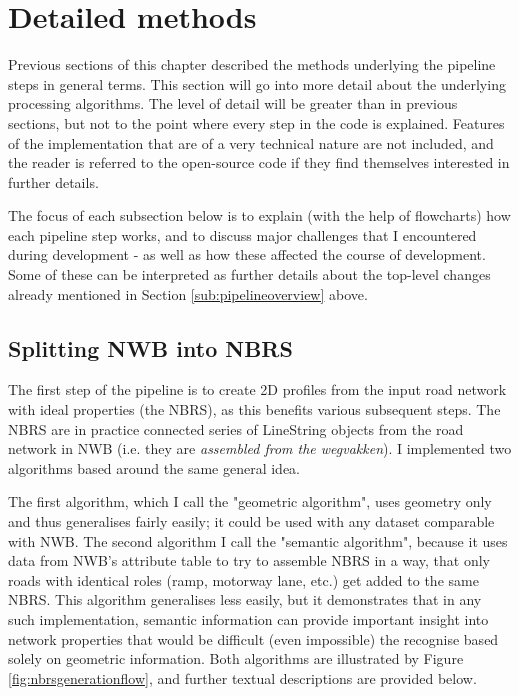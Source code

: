 \section{Detailed methods}
\label{sec:methods}

Previous sections of this chapter described the methods underlying the pipeline steps in general terms. This section will go into more detail about the underlying processing algorithms. The level of detail will be greater than in previous sections, but not to the point where every step in the code is explained. Features of the implementation that are of a very technical nature are not included, and the reader is referred to the open-source code if they find themselves interested in further details.

The focus of each subsection below is to explain (with the help of flowcharts) how each pipeline step works, and to discuss major challenges that I encountered during development - as well as how these affected the course of development. Some of these can be interpreted as further details about the top-level changes already mentioned in Section \ref{sub:pipelineoverview} above.

\subsection{Splitting NWB into NBRS}
\label{sub:m_nbrsgeneration}

The first step of the pipeline is to create 2D profiles from the input road network with ideal properties (the NBRS), as this benefits various subsequent steps. The NBRS are in practice connected series of LineString objects from the road network in NWB (i.e. they are \textit{assembled from the wegvakken}). I implemented two algorithms based around the same general idea.

The first algorithm, which I call the "geometric algorithm", uses geometry only and thus generalises fairly easily; it could be used with any dataset comparable with NWB. The second algorithm I call the "semantic algorithm", because it uses data from NWB's attribute table to try to assemble NBRS in a way, that only roads with identical roles (ramp, motorway lane, etc.) get added to the same NBRS. This algorithm generalises less easily, but it demonstrates that in any such implementation, semantic information can provide important insight into network properties that would be difficult (even impossible) the recognise based solely on geometric information. Both algorithms are illustrated by Figure \ref{fig:nbrsgenerationflow}, and further textual descriptions are provided below.

